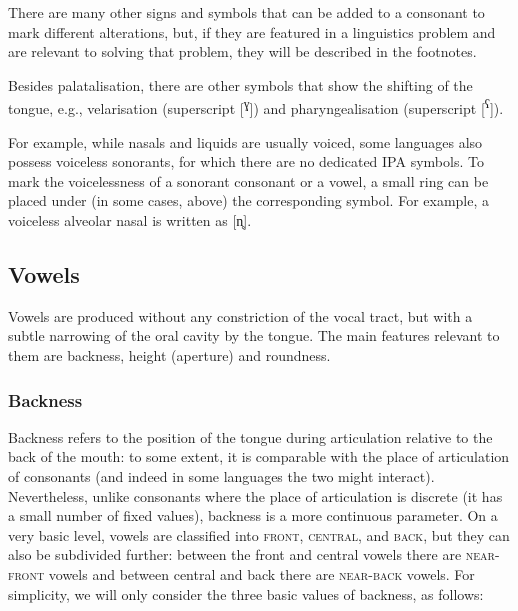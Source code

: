 \begin{refsection}
There are many other signs and symbols that can be added to a consonant to mark different alterations, but, if they are featured in a linguistics problem and are relevant to solving that problem, they will be described in the footnotes.

Besides palatalisation, there are other symbols that show the shifting of the tongue, e.g., velarisation (superscript [\textsuperscript{ɣ}]) and pharyngealisation (superscript [\textsuperscript{ʕ}]).

For example, while nasals and liquids are usually voiced, some languages also possess voiceless sonorants, for which there are no dedicated IPA symbols. To mark the voicelessness of a sonorant consonant or a vowel, a small ring can be placed under (in some cases, above) the corresponding symbol. For example, a voiceless alveolar nasal is written as [{n̥}].

\subsection{Vowels}

Vowels are produced without any constriction of the vocal tract, but with a subtle narrowing of the oral cavity by the tongue. The main features relevant to them are backness, height (aperture) and roundness.

\subsubsection{Backness}

Backness refers to the position of the tongue during articulation relative to the back of the mouth: to some extent, it is comparable with the place of articulation of consonants (and indeed in some languages the two might interact). Nevertheless, unlike consonants where the place of articulation is discrete (it has a small number of fixed values), backness is a more continuous parameter. On a very basic level, vowels are classified into \textsc{front}, \textsc{central}, and \textsc{back}, but they can also be subdivided further: between the front and central vowels there are \textsc{near-front} vowels and between central and back there are \textsc{near-back} vowels. For simplicity, we will only consider the three basic values of backness, as follows:


\end{refsection}
